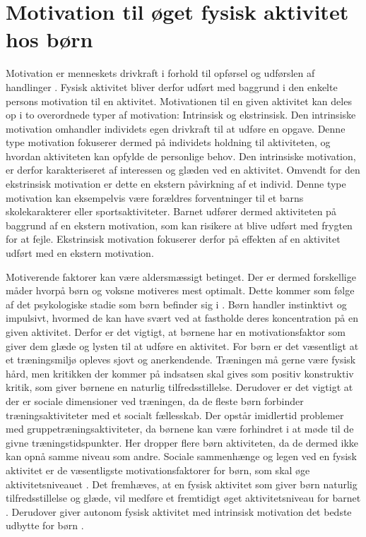 \section{Motivation til øget fysisk aktivitet hos børn} \label{motivation_boern}
Motivation er menneskets drivkraft i forhold til opførsel og udførslen af handlinger \citep{V.Brown2007}. Fysisk aktivitet bliver derfor udført med baggrund i den enkelte persons motivation til en aktivitet. Motivationen til en given aktivitet kan deles op i to overordnede typer af motivation: Intrinsisk og ekstrinsisk. Den intrinsiske motivation omhandler individets egen drivkraft til at udføre en opgave. Denne type motivation fokuserer dermed på individets holdning til aktiviteten, og hvordan aktiviteten kan opfylde de personlige behov. Den intrinsiske motivation, er derfor karakteriseret af interessen og glæden ved en aktivitet. Omvendt for den ekstrinsisk motivation er dette en ekstern påvirkning af et individ. Denne type motivation kan eksempelvis være forældres forventninger til et barns skolekarakterer eller sportsaktiviteter. Barnet udfører dermed aktiviteten på baggrund af en ekstern motivation, som kan risikere at blive udført med frygten for at fejle. Ekstrinsisk motivation fokuserer derfor på effekten af en aktivitet udført med en ekstern motivation. \citep{J.Sebire2013} 

Motiverende faktorer kan være aldersmæssigt betinget. Der er dermed forskellige måder hvorpå børn og voksne motiveres mest optimalt. Dette kommer som følge af det psykologiske stadie som børn befinder sig i \citep{V.Brown2007}. Børn handler instinktivt og impulsivt, hvormed de kan have svært ved at fastholde deres koncentration på en given aktivitet. Derfor er det vigtigt, at børnene har en motivationsfaktor som giver dem glæde og lysten til at udføre en aktivitet. \citep{V.Brown2007} \newline
For børn er det væsentligt at et træningsmiljø opleves sjovt og anerkendende. Træningen må gerne være fysisk hård, men kritikken der kommer på indsatsen skal gives som positiv konstruktiv kritik, som giver børnene en naturlig tilfredsstillelse. Derudover er det vigtigt at der er sociale dimensioner ved træningen, da de fleste børn forbinder træningsaktiviteter med et socialt fællesskab. Der opstår imidlertid problemer med gruppetræningsaktiviteter, da børnene kan være forhindret i at møde til de givne træningstidspunkter. Her dropper flere børn aktiviteten, da de dermed ikke kan opnå samme niveau som andre. \citep{Wied2011,Romani2013}\newline
Sociale sammenhænge og legen ved en fysisk aktivitet er de væsentligste motivationsfaktorer for børn, som skal øge aktivitetsniveauet \citep{McWhorter2003,J.Sebire2013}. Det fremhæves, at en fysisk aktivitet som giver børn naturlig tilfredsstillelse og glæde, vil medføre et fremtidigt øget aktivitetsniveau for barnet \citep{Romani2013}. Derudover giver autonom fysisk aktivitet med intrinsisk motivation det bedste udbytte for børn \citep{J.Sebire2013}.

